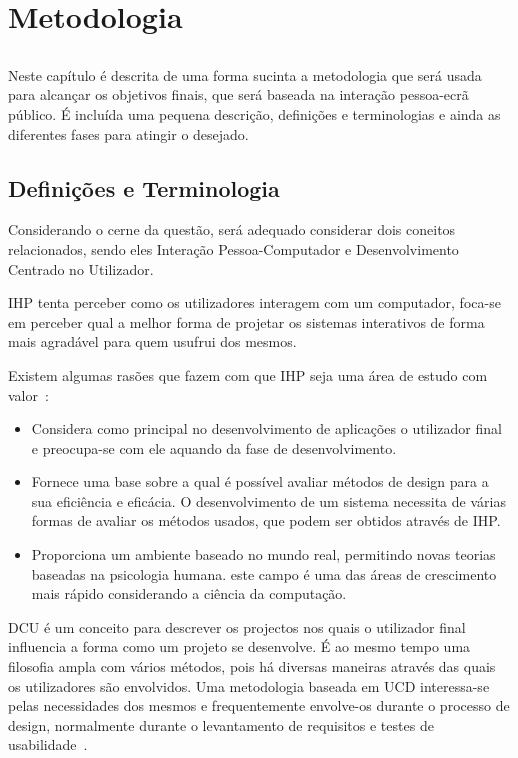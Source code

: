 \chapter{Metodologia} \label{chap:metod}

\section*{}

Neste capítulo é descrita de uma forma sucinta a metodologia que será usada para alcançar os objetivos finais, que será baseada na interação pessoa-ecrã público. É incluída uma pequena descrição, definições e terminologias e ainda as diferentes fases para atingir o desejado. 

\section{Definições e Terminologia}

Considerando o cerne da questão, será adequado considerar dois coneitos relacionados, sendo eles Interação Pessoa-Computador e Desenvolvimento Centrado no Utilizador.

IHP tenta perceber como os utilizadores interagem com um computador, foca-se em perceber qual a melhor forma de projetar os sistemas interativos de forma mais agradável para quem usufrui dos mesmos.

Existem algumas rasões que fazem com que IHP seja uma área de estudo com valor~\cite{smith2006human}:
\begin{itemize}
	\item Considera como principal no desenvolvimento de aplicações o utilizador final e preocupa-se com ele aquando da fase de desenvolvimento.
	\item Fornece uma base sobre a qual é possível avaliar métodos de design para a sua eficiência e eficácia. O desenvolvimento de um sistema necessita de várias formas de avaliar os métodos usados, que podem ser obtidos através de IHP.
	\item Proporciona um ambiente baseado no mundo real, permitindo novas teorias baseadas na psicologia humana. este campo é uma das áreas de crescimento mais rápido considerando a ciência da computação.
\end{itemize}

DCU é um conceito para descrever os projectos nos quais o utilizador final influencia a forma como um projeto se desenvolve. É ao mesmo tempo uma filosofia ampla com vários métodos, pois há diversas maneiras através das quais os utilizadores são envolvidos. Uma metodologia baseada em UCD interessa-se pelas necessidades dos mesmos e frequentemente envolve-os durante o processo de design, normalmente durante o levantamento de requisitos e testes de usabilidade~\cite{Abras2004}.


